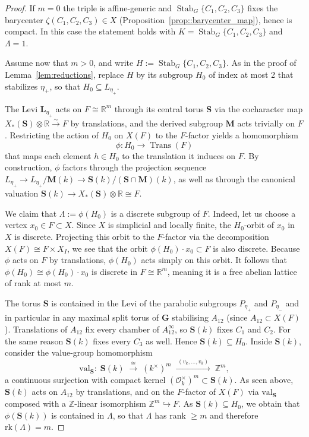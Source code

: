 \documentclass[11pt]{amsart}
\newcommand{\rk}{\mathrm{rk}}
\newcommand{\bbR}{\mathbb{R}}
\newcommand{\bbZ}{\mathbb{Z}}
\newcommand{\bfG}{\mathbf{G}}
\newcommand{\bfM}{\mathbf{M}}
\newcommand{\bfL}{\mathbf{L}}
\newcommand{\bfS}{\mathbf{S}}
\DeclareMathOperator{\Stab}{Stab}
\theoremstyle{plain}
\theoremstyle{definition}
\theoremstyle{remark}
\begin{document}
	\begin{proof}
		If $m=0$ the triple is affine-generic and $\Stab_G\{C_1,C_2,C_3\}$ fixes the barycenter $\zeta(C_1,C_2,C_3)\in X$ (Proposition~\ref{prop::barycenter_map}), hence is compact. In this case the statement holds with $K=\Stab_G\{C_1,C_2,C_3\}$ and $\Lambda=1$. 
		
		Assume now that $m>0$, and write $H:=\operatorname{Stab}_G\{C_1,C_2,C_3\}$. As in the proof of Lemma~\ref{lem:reductions}, replace $H$ by its subgroup $H_0$ of index at most 2 that stabilizes $\eta_+$, so that $H_0\subseteq L_{\eta_+}$.
		
		The Levi $\bfL_{\eta_+}$ acts on $F\cong\bbR^m$ through its central torus $\bfS$ via the cocharacter map $X_*(\bfS)\otimes\bbR\xrightarrow{\sim}F$ by translations, and the derived subgroup $\bfM$ acts trivially on $F$. Restricting the action of $H_0$ on $X(F)$ to the $F$-factor yields a homomorphism
\[
\phi \colon H_0 \longrightarrow \operatorname{Trans}(F)
\]
that maps each element $h \in H_0$ to the translation it induces on $F$. By construction, $\phi$ factors through the projection sequence $L_{\eta_+} \to L_{\eta_+} / \mathbf{M}(k) \to \mathbf{S}(k) / (\mathbf{S} \cap \mathbf{M})(k)$, as well as through the canonical valuation $\mathbf{S}(k) \to X_*(\mathbf{S}) \otimes \mathbb{R} \cong F$.

We claim that $\Lambda := \phi(H_0)$ is a discrete subgroup of $F$. Indeed, let us choose a vertex $x_0 \in F \subset X$. Since $X$ is simplicial and locally finite, the $H_0$-orbit of $x_0$ in $X$ is discrete. Projecting this orbit to the $F$-factor via the decomposition $X(F) \cong F \times X_I$, we see that the orbit $\phi(H_0) \cdot x_0 \subset F$ is also discrete. Because $\phi$ acts on $F$ by translations, $\phi(H_0)$ acts simply on this orbit. It follows that $\phi(H_0) \cong \phi(H_0) \cdot x_0$ is discrete in $F \cong \mathbb{R}^m$, meaning it is a free abelian lattice of rank at most $m$.
		
		The torus $\bfS$ is contained in the Levi of the parabolic subgroups $P_{\eta_+} $ and $P_{\eta_-}$ and in particular in any maximal split torus of $\bfG$ stabilising $A_{12}$ (since $A_{12}\subset X(F)$). Translations of $A_{12}$ fix every chamber of $A_{12}^\infty$, so $\bfS(k)$ fixes $C_1$ and $C_2$. For the same reason $\bfS(k)$ fixes every $C_3$ as well. Hence $\bfS(k)\subseteq H_0$. Inside $\bfS(k)$, consider the value-group homomorphism
		\[
		\mathrm{val}_{\bfS}:\;\bfS(k)\;\xrightarrow{\;\cong\;}\;(k^\times)^m\;\xrightarrow{\;(v_k,\dots,v_k)\;}\;\bbZ^m,
		\]
		a continuous surjection with compact kernel $(\mathcal O_k^\times)^m\subset\bfS(k)$. As seen above, $\bfS(k)$ acts on $A_{12}$ by translations, and on the $F$-factor of $X(F)$ via $\mathrm{val}_{\bfS}$ composed with a $\bbZ$-linear isomorphism $\bbZ^m\hookrightarrow F$. As $\bfS(k)\subseteq H_0$, we obtain that $\phi(\bfS(k))$ is contained in $\Lambda$, so that $\Lambda$ has rank $\ge m$ and therefore $\rk(\Lambda)= m$.
		

\end{proof}
\end{document}
